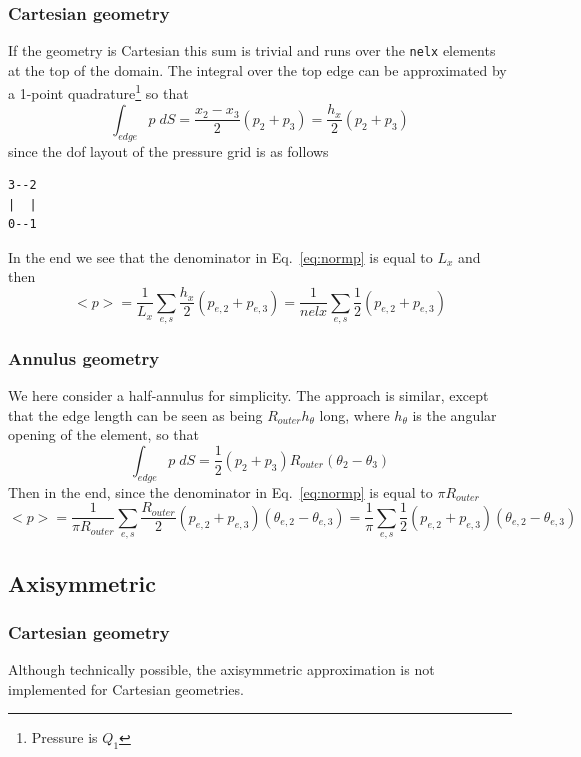 \documentclass[a4paper,12pt]{article}
\begin{document}
\subsubsection{Cartesian geometry}
If the geometry is Cartesian this sum is trivial and runs over the \lstinline{nelx} elements
at the top of the domain.
The integral over the top edge can be approximated by a 1-point quadrature\footnote{Pressure is $Q_1$}
so that 
\[
\int_{edge} p \; dS %
= \frac{x_2-x_3}{2} (p_2 + p_3)
= \frac{h_x}{2} (p_2 + p_3)
\]
since the dof layout of the pressure grid is as follows
\begin{verbatim}
3--2
|  |
0--1
\end{verbatim}
In the end we see that the denominator in Eq.~\eqref{eq:normp} is equal to $L_x$ and then
\[
<p> 
= \frac{1}{L_x} \sum_{e,s} \frac{h_x}{2} (p_{e,2} + p_{e,3}) 
= \frac{1}{nelx} \sum_{e,s} \frac12 (p_{e,2} + p_{e,3}) 
\]

\subsubsection{Annulus geometry}

We here consider a half-annulus for simplicity.
The approach is similar, except that the edge length can be seen as being $R_{outer} h_\theta$ long, 
where $h_\theta$ is the angular opening of the element, so that 
\[
\int_{edge} p \; dS %
= \frac12 (p_2 + p_3) R_{outer} (\theta_2-\theta_3)
\]
Then in the end, since the denominator in Eq.~\eqref{eq:normp} is equal to $\pi R_{outer}$
\[
<p>= \frac{1}{\pi R_{outer}} \sum_{e,s} \frac{R_{outer}}{2} (p_{e,2} + p_{e,3})  (\theta_{e,2}-\theta_{e,3})
= \frac{1}{\pi} \sum_{e,s} \frac12 (p_{e,2} + p_{e,3})  (\theta_{e,2}-\theta_{e,3})
\]






\subsection{Axisymmetric}

\subsubsection{Cartesian geometry}

Although technically possible, the axisymmetric approximation 
is not implemented for Cartesian geometries.
\end{document}
